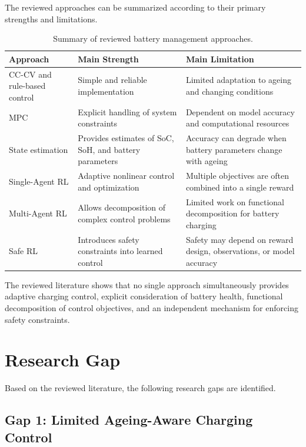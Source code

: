 The reviewed approaches can be summarized according to their primary
strengths and limitations.

\begin{table}[htbp]
\centering
\caption{Summary of reviewed battery management approaches.}
\label{tab:literature_summary}
\begin{tabular}{p{3.0cm}p{4.0cm}p{4.5cm}}
\toprule
\textbf{Approach} & \textbf{Main Strength} & \textbf{Main Limitation} \\
\midrule
CC-CV and rule-based control &
Simple and reliable implementation &
Limited adaptation to ageing and changing conditions \\

MPC &
Explicit handling of system constraints &
Dependent on model accuracy and computational resources \\

State estimation &
Provides estimates of SoC, SoH, and battery parameters &
Accuracy can degrade when battery parameters change with ageing \\

Single-Agent RL &
Adaptive nonlinear control and optimization &
Multiple objectives are often combined into a single reward \\

Multi-Agent RL &
Allows decomposition of complex control problems &
Limited work on functional decomposition for battery charging \\

Safe RL &
Introduces safety constraints into learned control &
Safety may depend on reward design, observations, or model accuracy \\
\bottomrule
\end{tabular}
\end{table}

The reviewed literature shows that no single approach simultaneously
provides adaptive charging control, explicit consideration of battery
health, functional decomposition of control objectives, and an
independent mechanism for enforcing safety constraints.

\section{Research Gap}

Based on the reviewed literature, the following research gaps are
identified.

\subsection{Gap 1: Limited Ageing-Aware Charging Control}

